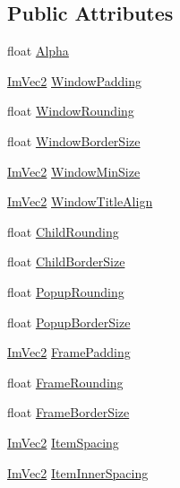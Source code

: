 \subsection*{Public Attributes}
\begin{DoxyCompactItemize}
\item 
float \mbox{\hyperlink{struct_im_gui_style_a993312606e9dcb7ca165245150a4da72}{Alpha}}
\item 
\mbox{\hyperlink{struct_im_vec2}{Im\+Vec2}} \mbox{\hyperlink{struct_im_gui_style_a37f156b53e6dcc99ff57366ceafe8b50}{Window\+Padding}}
\item 
float \mbox{\hyperlink{struct_im_gui_style_acd902c2ab4b53d4bb0f64da608320894}{Window\+Rounding}}
\item 
float \mbox{\hyperlink{struct_im_gui_style_a4e2af4dd711f57ee841f9c843a18bec2}{Window\+Border\+Size}}
\item 
\mbox{\hyperlink{struct_im_vec2}{Im\+Vec2}} \mbox{\hyperlink{struct_im_gui_style_a060b2f743a086d0f0fee4cd5b3f372d4}{Window\+Min\+Size}}
\item 
\mbox{\hyperlink{struct_im_vec2}{Im\+Vec2}} \mbox{\hyperlink{struct_im_gui_style_a3fc57a15ab8f206045f1e5dfccd8b2e7}{Window\+Title\+Align}}
\item 
float \mbox{\hyperlink{struct_im_gui_style_aba2b4c6be52366ce2ac06b7849cd5cb2}{Child\+Rounding}}
\item 
float \mbox{\hyperlink{struct_im_gui_style_a5dd4fc33733ac7171d88740eb777f2e3}{Child\+Border\+Size}}
\item 
float \mbox{\hyperlink{struct_im_gui_style_a44b39e666946eea00001b6e38ab6bdc7}{Popup\+Rounding}}
\item 
float \mbox{\hyperlink{struct_im_gui_style_ac3bc5e785e360f72b580d419953c9db4}{Popup\+Border\+Size}}
\item 
\mbox{\hyperlink{struct_im_vec2}{Im\+Vec2}} \mbox{\hyperlink{struct_im_gui_style_af58dc4e954ac95fdb3b0df8efb2fa564}{Frame\+Padding}}
\item 
float \mbox{\hyperlink{struct_im_gui_style_a15402cededdef985487e986ccce73ad2}{Frame\+Rounding}}
\item 
float \mbox{\hyperlink{struct_im_gui_style_a21d8f1680e9f897998d726fdf0123bf2}{Frame\+Border\+Size}}
\item 
\mbox{\hyperlink{struct_im_vec2}{Im\+Vec2}} \mbox{\hyperlink{struct_im_gui_style_a6bc07d81e049cd75e86e6b3753c0da4a}{Item\+Spacing}}
\item 
\mbox{\hyperlink{struct_im_vec2}{Im\+Vec2}} \mbox{\hyperlink{struct_im_gui_style_a1a12021be99583fb491cff2df75d1ae1}{Item\+Inner\+Spacing}}

\end{DoxyCompactItemize}
